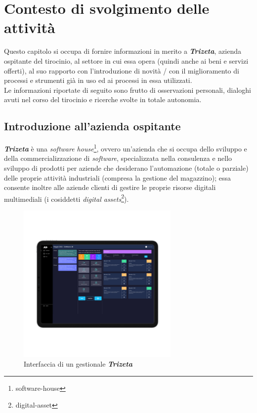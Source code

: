 \chapter{Contesto di svolgimento delle attività}
\label{cap:contesto-svolgimento}

Questo capitolo si occupa di fornire informazioni in merito a \textit{\textbf{Trizeta}}, azienda ospitante del tirocinio, al settore in cui essa opera (quindi anche ai beni e servizi offerti), 
al suo rapporto con l'introduzione di novità / con il miglioramento di processi e strumenti già in uso ed ai processi in essa utilizzati. \\
Le informazioni riportate di seguito sono frutto di osservazioni personali, dialoghi avuti nel corso del tirocinio e ricerche svolte in totale autonomia.

\section{Introduzione all'azienda ospitante}

\textit{\textbf{Trizeta}} è una \textit{software house}\footnote{\gls{software-house}}, ovvero un'azienda che si occupa dello sviluppo e della commercializzazione di \textit{software}, specializzata nella consulenza e nello sviluppo
di prodotti per aziende che desiderano l'automazione (totale o parziale) delle proprie attività industriali (compresa la gestione del magazzino); essa consente inoltre alle aziende clienti di gestire le proprie risorse digitali multimediali (i cosiddetti \textit{digital assets}\footnote{\gls{digital-asset}}).
\vspace{-20mm}
    \begin{figure}[H]
        \centering
        \includegraphics[width=0.7\textwidth]{images/adesuite.png}
        \vspace{-15mm}
        \caption[Caption for LOF]{Interfaccia di un gestionale \textit{\textbf{Trizeta}}\footnotemark}
    \end{figure}

